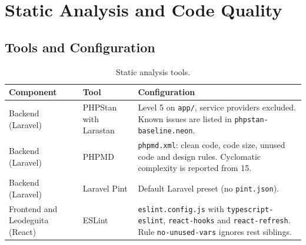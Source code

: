 \section{Static Analysis and Code Quality}
\label{sec:static-analysis}

\subsection{Tools and Configuration}

\begin{table}[H]
  \centering
  \begin{tabularx}{\linewidth}{L{3.2cm}L{3.2cm}Y}
    \toprule
    Component & Tool & Configuration \\
    \midrule
    Backend (Laravel) & PHPStan with Larastan &
    Level 5 on \texttt{app/}, service providers excluded.
    Known issues are listed in \texttt{phpstan-baseline.neon}. \\
    Backend (Laravel) & PHPMD &
    \texttt{phpmd.xml}: clean code, code size, unused code and design rules.
    Cyclomatic complexity is reported from 15. \\
    Backend (Laravel) & Laravel Pint &
    Default Laravel preset (no \texttt{pint.json}). \\
    Frontend and Leodeguita (React) & ESLint &
    \texttt{eslint.config.js} with \texttt{typescript-eslint}, \texttt{react-hooks} and \texttt{react-refresh}.
    Rule \texttt{no-unused-vars} ignores rest siblings. \\
    \bottomrule
  \end{tabularx}
  \caption{Static analysis tools.}
  \label{tab:static-tools}
\end{table}



